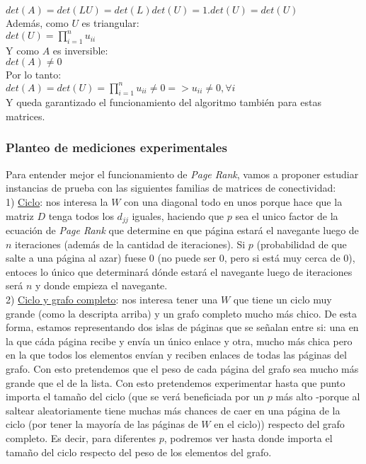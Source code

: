 				$det(A) = det(LU) = det(L)det(U) = 1.det(U) = det(U)$ \\

				Además, como $U$ es triangular: \\

				$det(U) = \prod_{i=1}^{n} u_{ii}$ \\

				Y como $A$ es inversible: \\

				$det(A) \neq 0$ \\

				Por lo tanto: \\

				$det(A) = det(U) = \prod_{i=1}^{n} u_{ii} \neq 0 => u_{ii} \neq 0, \forall i$ \\

				Y queda garantizado el funcionamiento del algoritmo también para estas matrices. \\

		\subsubsection{Planteo de mediciones experimentales}

			Para entender mejor el funcionamiento de \textit{Page Rank}, vamos a proponer estudiar instancias de prueba con las siguientes familias de matrices de conectividad:\\

			1) \underline{Ciclo}: nos interesa la $W$ con una diagonal todo en unos porque hace que la matriz $D$ tenga todos los $d_{jj}$ iguales, haciendo que $p$ sea el unico factor de la ecuación de \textit{Page Rank} que determine en que página estará el navegante luego de $n$ iteraciones (además de la cantidad de iteraciones). Si $p$ (probabilidad de que salte a una página al azar) fuese $0$ (no puede ser $0$, pero si está muy cerca de $0$), entoces lo único que determinará dónde estará el navegante luego de iteraciones será $n$ y donde empieza el navegante. \\

			2) \underline{Ciclo y grafo completo}: nos interesa tener una $W$ que tiene un ciclo muy grande (como la descripta arriba) y un grafo completo mucho más chico. De esta forma, estamos representando dos islas de páginas que se señalan entre si: una en la que cáda página recibe y envía un único enlace y otra, mucho más chica pero en la que todos los elementos envían y reciben enlaces de todas las páginas del grafo. Con esto pretendemos que el peso de cada página del grafo sea mucho más grande que el de la lista. Con esto pretendemos experimentar hasta que punto importa el tamaño del ciclo (que se verá beneficiada por un $p$ más alto -porque al saltear aleatoriamente tiene muchas más chances de caer en una página de la ciclo (por tener la mayoría de las páginas de $W$ en el ciclo)) respecto del grafo completo. Es decir, para diferentes $p$, podremos ver hasta donde importa el tamaño del ciclo respecto del peso de los elementos del grafo. \\


